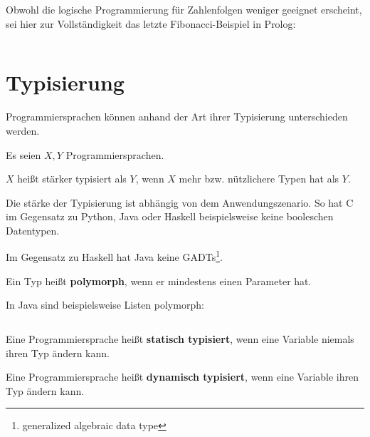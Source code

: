 \begin{beispiel}
    Obwohl die logische Programmierung für Zahlenfolgen weniger geeignet erscheint,
    sei hier zur Vollständigkeit das letzte Fibonacci-Beispiel in Prolog:
    \inputminted[numbersep=5pt, tabsize=4]{prolog}{scripts/prolog/fibonacci.pl}
\end{beispiel}

\section{Typisierung}
Programmiersprachen können anhand der Art ihrer Typisierung unterschieden werden.

\begin{definition}[Typisierungsstärke]%
    Es seien $X, Y$ Programmiersprachen.

    $X$ heißt stärker typisiert als $Y$, wenn $X$ mehr bzw. nützlichere Typen hat als $Y$.
\end{definition}

\begin{beispiel}[Typisierungsstärke]
    Die stärke der Typisierung ist abhängig von dem Anwendungszenario. So hat C im 
    Gegensatz zu Python, Java oder Haskell beispielsweise keine booleschen Datentypen.

    Im Gegensatz zu Haskell hat Java keine GADTs\footnote{generalized algebraic data type}.
\end{beispiel}

\begin{definition}[Polymorphie]%
    Ein Typ heißt \textbf{polymorph}, wenn er mindestens einen Parameter hat.
\end{definition}

\begin{beispiel}[Polymorphie]
    In Java sind beispielsweise Listen polymorph:

    \inputminted[numbersep=5pt, tabsize=4]{java}{scripts/java/list-example.java}
\end{beispiel}

\begin{definition}%
    \begin{defenum}
        \item Eine Programmiersprache heißt \textbf{statisch typisiert}, wenn eine 
              Variable niemals ihren Typ ändern kann.
        \item Eine Programmiersprache heißt \textbf{dynamisch typisiert}, wenn eine 
              Variable ihren Typ ändern kann.
    \end{defenum}
\end{definition}

